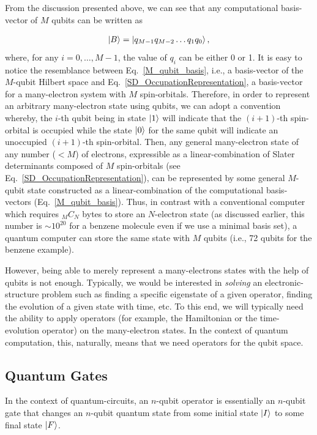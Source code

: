 \documentclass[12pt,oneside]{book}
\begin{document}
From the discussion presented above, we can see that any computational basis-vector of $M$ qubits can be written as

\begin{align}\label{M_qubit_basis}
    \ket{B} = \ket{q_{M-1}q_{M-2}\hdots q_1 q_0},
\end{align}
where, for any $i=0,\hdots,M-1$, the value of $q_i$ can be either 0 or 1. It is easy to notice the resemblance between Eq.~\ref{M_qubit_basis}, i.e., a basis-vector of the $M$-qubit Hilbert space and Eq.~\ref{SD_OccupationRepresentation}, a basis-vector for a many-electron system with $M$ spin-orbitals. Therefore, in order to represent an arbitrary many-electron state using qubits, we can adopt a convention whereby, the $i$-th qubit being in state $\ket{1}$ will indicate that the $(i+1)$-th spin-orbital is occupied while the state $\ket{0}$ for the same qubit will indicate an unoccupied $(i+1)$-th spin-orbital. Then, any general many-electron state of any number ($<M$) of electrons, expressible as a linear-combination of Slater determinants composed of $M$ spin-orbitals (see Eq.~\ref{SD_OccupationRepresentation}), can be represented by some general $M$-qubit state constructed as a linear-combination of the computational basis-vectors (Eq.~\ref{M_qubit_basis}). Thus, in contrast with a conventional computer which requires $_MC_N$ bytes to store an $N$-electron state (as discussed earlier, this number is $\sim 10^{20}$ for a benzene molecule even if we use a minimal basis set), a quantum computer can store the same state with $M$ qubits (i.e., 72 qubits for the benzene example).

However, being able to merely represent a many-electrons states with the help of qubits is not enough. Typically, we would be interested in \textit{solving} an electronic-structure problem such as finding a specific eigenstate of a given operator, finding the evolution of a given state with time, etc. To this end, we will typically need the ability to apply operators (for example, the Hamiltonian or the time-evolution operator) on the many-electron states. In the context of quantum computation, this, naturally, means that we need operators for the qubit space. 

\subsection*{Quantum Gates}

In the context of quantum-circuits, an $n$-qubit operator is essentially an $n$-qubit gate that changes an $n$-qubit quantum state from some initial state $\ket{I}$ to some final state $\ket{F}$.
\end{document}
